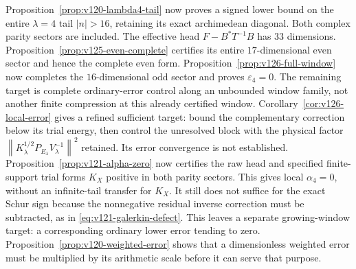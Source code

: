 \documentclass[11pt]{article}
\theoremstyle{remark}
\newcommand{\norm}[1]{\left\lVert #1\right\rVert}
\begin{document}
Proposition~\ref{prop:v120-lambda4-tail} now proves a signed lower
bound on the entire $\lambda=4$ tail $|n|>16$, retaining its exact
archimedean diagonal. Both complex parity sectors are included.
The effective head $F-B^*T^{-1}B$ has $33$ dimensions.
Proposition~\ref{prop:v125-even-complete} certifies its entire
$17$-dimensional even sector and hence the complete even form.
Proposition~\ref{prop:v126-full-window} now completes the
$16$-dimensional odd sector and proves $\varepsilon_4=0$.
The remaining target is complete ordinary-error control along an
unbounded window family, not another finite compression at this
already certified window.
Corollary~\ref{cor:v126-local-error} gives a refined sufficient
target: bound the complementary correction below its trial energy,
then control the unresolved block with the physical factor
$\norm{K_\lambda^{1/2}P_{E_\lambda}V_\lambda^{-1}}^2$
retained. Its error convergence is not established. Proposition~\ref{prop:v121-alpha-zero} now certifies the
raw head and specified finite-support trial forms $K_X$ positive in
both parity sectors. This gives local $\alpha_4=0$, without an
infinite-tail transfer for $K_X$. It still does not suffice for the
exact Schur sign because the nonnegative residual inverse correction
must be subtracted, as in \eqref{eq:v121-galerkin-defect}.
This leaves a separate growing-window target: a corresponding ordinary
lower error tending to zero. Proposition~\ref{prop:v120-weighted-error}
shows that a dimensionless weighted error must be multiplied by its
arithmetic scale before it can serve that purpose.
\end{document}
